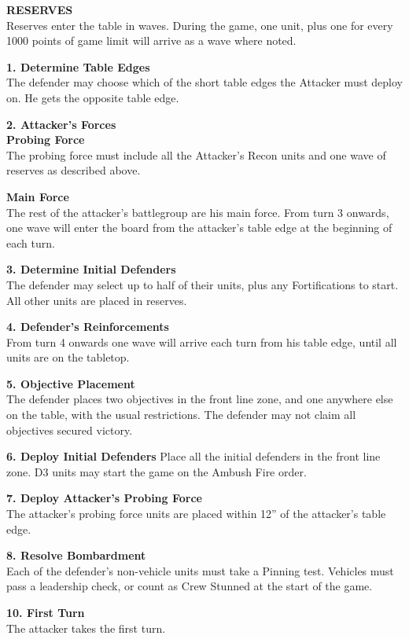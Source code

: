 \documentclass[letterpaper,twocolumn,oneside,titlepage]{book}
\begin{document}
\textbf{RESERVES}\\
Reserves enter the table in waves. During the game, one unit, plus one
for every 1000 points of game limit will arrive as a wave where noted.

\textbf{1. Determine Table Edges}\\
The defender may choose which of the short table edges the Attacker must
deploy on. He gets the opposite table edge.

\textbf{2. Attacker's Forces}\\
\textbf{Probing Force}\\
The probing force must include all the Attacker's Recon units and one
wave of reserves as described above.

\textbf{Main Force}\\
The rest of the attacker's battlegroup are his main force. From turn 3
onwards, one wave will enter the board from the attacker's table edge at
the beginning of each turn.

\textbf{3. Determine Initial Defenders}\\
The defender may select up to half of their units, plus any
Fortifications to start. All other units are placed in reserves.

\textbf{4. Defender's Reinforcements}\\
From turn 4 onwards one wave will arrive each turn from his table edge,
until all units are on the tabletop.

\textbf{5. Objective Placement}\\
The defender places two objectives in the front line zone, and one
anywhere else on the table, with the usual restrictions. The defender
may not claim all objectives secured victory.

\textbf{6. Deploy Initial Defenders} Place all the initial defenders in
the front line zone. D3 units may start the game on the Ambush Fire
order.

\textbf{7. Deploy Attacker's Probing Force}\\
The attacker's probing force units are placed within 12'' of the
attacker's table edge.

\textbf{8. Resolve Bombardment}\\
Each of the defender's non-vehicle units must take a Pinning test.
Vehicles must pass a leadership check, or count as Crew Stunned at the
start of the game.

\textbf{10. First Turn}\\
The attacker takes the first turn. \pagebreak
\end{document}
